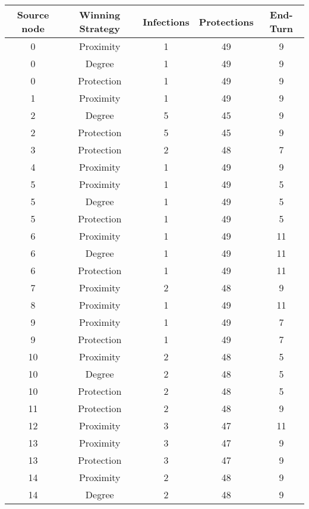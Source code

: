 \documentclass[results.tex]{subfiles}
\begin{document}
\begin{center}
  \begin{tabular}{| c || c | c | c | c |}
    \hline
    {\bfseries Source node} & {\bfseries Winning Strategy} & {\bfseries Infections} & {\bfseries Protections} & {\bfseries End-Turn} \\  %
    \hline\hline
    0 & Proximity & 1 & 49 & 9 \\ 
    \hline
    0 & Degree & 1 & 49 & 9 \\ 
    \hline
    0 & Protection & 1 & 49 & 9 \\ 
    \hline
    1 & Proximity & 1 & 49 & 9 \\ 
    \hline
    2 & Degree & 5 & 45 & 9 \\ 
    \hline
    2 & Protection & 5 & 45 & 9 \\ 
    \hline
    3 & Protection & 2 & 48 & 7 \\ 
    \hline
    4 & Proximity & 1 & 49 & 9 \\ 
    \hline
    5 & Proximity & 1 & 49 & 5 \\ 
    \hline
    5 & Degree & 1 & 49 & 5 \\ 
    \hline
    5 & Protection & 1 & 49 & 5 \\ 
    \hline
    6 & Proximity & 1 & 49 & 11 \\ 
    \hline
    6 & Degree & 1 & 49 & 11 \\ 
    \hline
    6 & Protection & 1 & 49 & 11 \\ 
    \hline
    7 & Proximity & 2 & 48 & 9 \\ 
    \hline
    8 & Proximity & 1 & 49 & 11 \\ 
    \hline
    9 & Proximity & 1 & 49 & 7 \\ 
    \hline
    9 & Protection & 1 & 49 & 7 \\ 
    \hline
    10 & Proximity & 2 & 48 & 5 \\ 
    \hline
    10 & Degree & 2 & 48 & 5 \\ 
    \hline
    10 & Protection & 2 & 48 & 5 \\ 
    \hline
    11 & Protection & 2 & 48 & 9 \\ 
    \hline
    12 & Proximity & 3 & 47 & 11 \\ 
    \hline
    13 & Proximity & 3 & 47 & 9 \\ 
    \hline
    13 & Protection & 3 & 47 & 9 \\ 
    \hline
    14 & Proximity & 2 & 48 & 9 \\ 
    \hline
    14 & Degree & 2 & 48 & 9 \\ 

\end{tabular}
\end{center}
\end{document}
